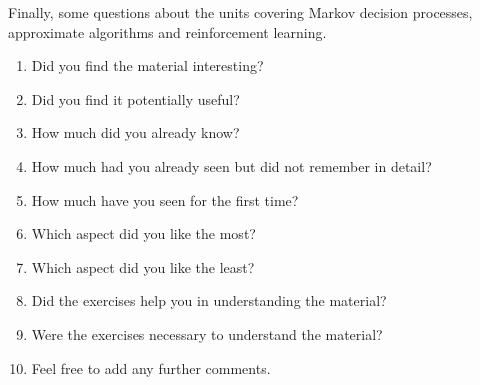 \documentclass[twoside,a4paper]{article}
\begin{document}
\begin{exercise}
  Finally, some questions about the units covering Markov decision processes,  approximate algorithms and reinforcement learning.
  \begin{enumerate}
  \item Did you find the material interesting?
  \item Did you find it potentially useful?
  \item How much did you already know?
  \item How much had you already seen but did not remember in detail?
  \item How much have you seen for the first time?
  \item Which aspect did you like the most?
  \item Which aspect did you like the least?
  \item Did the exercises help you in understanding the material?
  \item Were the exercises necessary to understand the material?
  \item Feel free to add any further comments.
  \end{enumerate}
\end{exercise}
\end{document}
